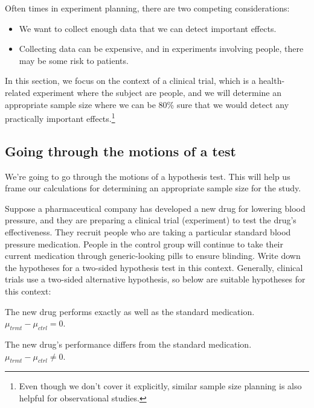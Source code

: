 \noindent%
Often times in experiment planning,
there are two competing considerations:
\begin{itemize}
\setlength{\itemsep}{0mm}
\item
    We want to collect enough data that we can detect
    important effects.
\item
    Collecting data can be expensive, and in experiments
    involving people, there may be some risk to patients.
\end{itemize}
In this section, we focus on the context of a clinical trial,
which is a health-related experiment where the subject
are people, and we will determine an appropriate sample size
where we can be 80\% sure that we would detect any practically
important effects.\footnote{Even though we don't cover it
  explicitly, similar sample size planning is also helpful
  for observational studies.}


\subsection{Going through the motions of a test}

We're going to go through the motions of a hypothesis test.
This will help us frame our calculations for determining
an appropriate sample size for the study.

\begin{examplewrap}
\begin{nexample}{Suppose a pharmaceutical company has developed
    a new drug for lowering blood pressure, and they are
    preparing a clinical trial (experiment) to test the
    drug's effectiveness.
    They recruit people who are taking a particular standard
    blood pressure medication.
    People in the control group will continue to take their
    current medication through generic-looking pills to ensure
    blinding.
    Write down the hypotheses for a two-sided hypothesis test
    in this context.}
  Generally, clinical trials use a two-sided alternative
  hypothesis, so below are suitable hypotheses for this context:
  \begin{description}
  \setlength{\itemsep}{0mm}
  \item[$H_0$:]
      The new drug performs exactly as well as the
      standard medication. \\
      $\mu_{trmt} - \mu_{ctrl} = 0$.
  \item[$H_A$:]
      The new drug's performance differs from the
      standard medication. \\
      $\mu_{trmt} - \mu_{ctrl} \neq 0$.
  \end{description}
\end{nexample}
\end{examplewrap}


